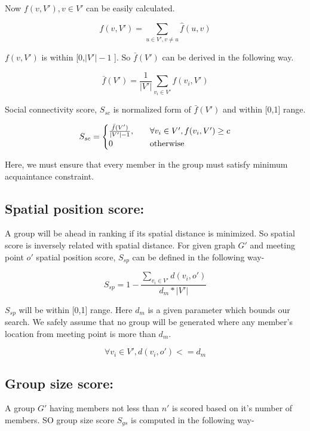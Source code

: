 \documentclass{vldb}
\begin{document}
		Now $ f(v,V'),v \in V'$ can be easily calculated.
		
		\[
		f(v,V')=\sum_{u \in V', v\neq u} \hat{f}(u,v)
		\]
		
		
		$ f(v,V')$ is  within  [0,$ |V'|-1 $ ]. So $\bar{f}(V') $ can be derived in the following way.
		
		
		\[
		\bar{f}(V')=\frac{1}{|V'|} \sum_{v_i \in V'} f(v_i,V')
		\]
		
		
		Social connectivity score, $ S_{sc} $ is normalized form of   $ \bar{f}(V') $ and within [0,1] range.
		
		\begin{equation*}
			S_{sc}=
			\begin{cases}
			\text{$ \frac{\bar{f}(V')}{|V'|-1} $,} & \quad\text{$ 	\forall v_i\in V',f(v_i,V') \geq c $}\\
			\text{0} & \quad\text{otherwise}							
			\end{cases}
		\end{equation*}
		
		Here, we must ensure that every member in the group must satisfy minimum acquaintance constraint.
	
		
		
		
		\subsection{Spatial position score:} 
		A group will be ahead in ranking if its spatial distance is minimized. So spatial score is inversely related with spatial distance.  For given graph $ G' $ and  meeting point $ o' $  spatial
		position score, $ S_{sp} $ can be defined in the following way-
		
		\[
		S_{sp}=1- \frac{\sum_{v_i \in V'} d(v_i,o')}{d_{m}*|V'|} 
		\]
		
		$ S_{sp} $ will be within [0,1] range. Here $ d_{m} $ is a given parameter which bounds our search. We safely assume that no group will be generated where any member's location from meeting point is more than $ d_{m} $. 
		
		\[
		\forall v_i \in V', d(v_i,o')<=d_{m}
		\]
		
		
		
		\subsection{Group size score:}
		A group $ G' $ having members not less than $ n' $ is scored based on it's number of members. SO group size score $S_{gs} $ is computed in the following way- 
		
\end{document}
